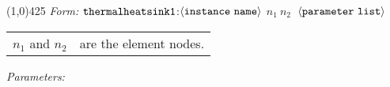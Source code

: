 \documentclass{article}
\begin{document}
\hrulefill\linethickness{0.5mm}\line(1,0){425}
\normalsize
\newline
\textit{Form:}
\newline
$\tt thermalheatsink1$:$\langle \tt{instance\ name}\rangle$ $n_1\ n_2\
$ $\langle \tt{parameter\ list}\rangle$
\newline
\begin{tabular}{r l}
$n_1$ and $n_2$ & are the element nodes. \\
\end{tabular}
\newline
\textit{Parameters:}
\end{document}
